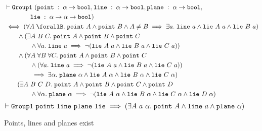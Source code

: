 \begin{figure}
  \begin{align*}
    &\vdash\code{Group1}\ (\code{point}\;:\;\alpha\rightarrow\code{bool}, \code{line}\;:\;\alpha\rightarrow\code{bool},\code{plane}\;:\;\alpha\rightarrow\code{bool},\\
    &\qquad\qquad\code{lie}\;:\;\alpha\rightarrow\alpha\rightarrow\code{bool})\\
    &\iff (\forall A\;\forallB.\; \code{point}\ A \wedge \code{point}\ B \wedge A \neq B \implies \exists a.\; \code{line}\ a \wedge \code{lie}\ A\ a \wedge \code{lie}\ B\ a)\\
    &\qquad\wedge (\exists A\ B\ C.\; \code{point}\ A \wedge \code{point}\ B \wedge \code{point}\ C\\
    &\qquad\qquad\wedge \forall a.\; \code{line}\ a \implies \neg(\code{lie}\ A\ a \wedge \code{lie}\ B\ a \wedge \code{lie}\ C\ a))\\
    &\qquad\wedge(\forall A\;\forall B\;\forall C.\; \code{point}\ A \wedge \code{point}\ B \wedge \code{point}\ C\\
    &\qquad\qquad\wedge (\forall a.\; \code{line}\ a \implies \neg(\code{lie}\ A\ a \wedge \code{lie}\ B\ a \wedge \code{lie}\ C\ a))\\
    &\qquad\qquad\implies\exists\alpha.\; \code{plane}\ \alpha \wedge \code{lie}\ A\ \alpha \wedge \code{lie}\ B\ \alpha \wedge \code{lie}\ C\ \alpha)\\
    &\qquad (\exists A\ B\ C\ D.\; \code{point}\ A \wedge \code{point}\ B \wedge \code{point}\ C \wedge \code{point}\ D\\
    &\qquad\qquad \wedge \forall\alpha.\; \code{plane}\ \alpha \implies \neg(\code{lie}\ A\ \alpha \wedge \code{lie}\ B\ \alpha \wedge \code{lie}\ C\ \alpha \wedge \code{lie}\ D\ \alpha)\\
  \end{align*}
  \begin{displaymath}
    \vdash \texttt{Group1}\ \texttt{point}\ \texttt{line}\ \texttt{plane}\ \texttt{lie} \implies (\exists A\ a\ \alpha.\; \texttt{point}\ A \wedge \texttt{line}\ a \wedge \texttt{plane}\ \alpha)
  \end{displaymath}
\caption{Points, lines and planes exist}
\label{fig:InhabitedTypes}
\end{figure}

